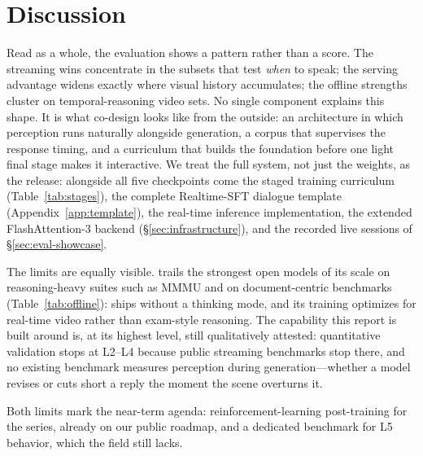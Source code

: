 \section{Discussion}\label{sec:discussion}

Read as a whole, the evaluation shows a pattern rather than a score.
The streaming wins concentrate in the subsets that test \emph{when} to
speak; the serving advantage widens exactly where visual history
accumulates; the offline strengths cluster on temporal-reasoning
video sets. No single component explains this shape. It is what
co-design looks like from the outside: an architecture in which
perception runs naturally alongside generation, a corpus that supervises the
response timing, and a curriculum that builds the foundation before
one light final stage makes it interactive. We treat the full system,
not just the weights, as the release: alongside all five checkpoints come the staged
training curriculum (Table~\ref{tab:stages}), the complete Realtime-SFT
dialogue template (Appendix~\ref{app:template}), the real-time
inference implementation, the extended FlashAttention-3 backend
(\S\ref{sec:infrastructure}), and the recorded live sessions of
\S\ref{sec:eval-showcase}.

The limits are equally visible. \mossinstruct{} trails the strongest
open models of its scale on reasoning-heavy suites such as MMMU and on
document-centric benchmarks (Table~\ref{tab:offline}): \mossvl{} ships
without a thinking mode, and its training optimizes for real-time video
rather than exam-style reasoning. The capability this report is built
around is, at its highest level, still qualitatively attested:
quantitative validation stops at L2--L4 because public streaming
benchmarks stop there, and no existing benchmark measures perception
during generation---whether a model revises or cuts short a reply the
moment the scene overturns it.

Both limits mark the near-term agenda: reinforcement-learning
post-training for the \mossvl{} series, already on our public roadmap,
and a dedicated benchmark for L5 behavior, which the field still
lacks.
